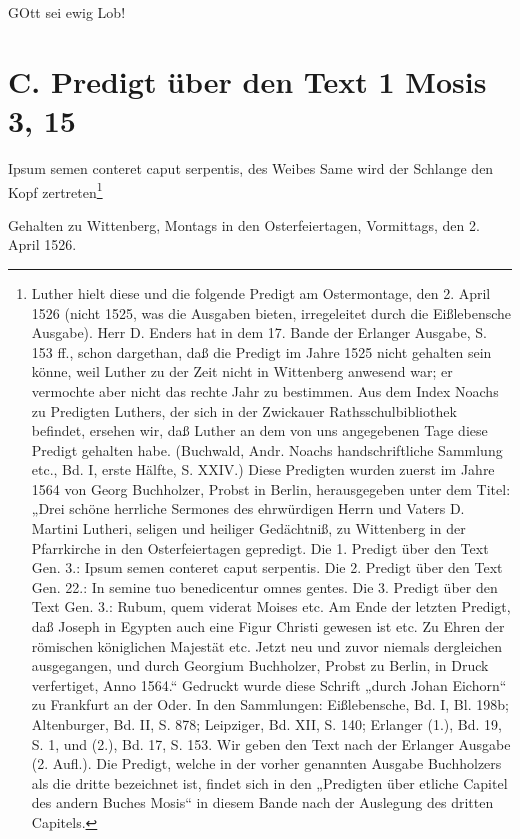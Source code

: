 GOtt sei ewig Lob!

\chapter{C. Predigt über den Text 1 Mosis 3, 15}

Ipsum semen conteret caput serpentis, des Weibes Same wird der Schlange den Kopf zertreten\footnote{Luther hielt diese und die folgende Predigt am Ostermontage, den 2. April 1526 (nicht 1525, was die Ausgaben bieten, irregeleitet durch die Eißlebensche Ausgabe). Herr D. Enders hat in dem 17. Bande der Erlanger Ausgabe, S. 153 ff., schon dargethan, daß die Predigt im Jahre 1525 nicht gehalten sein könne, weil Luther zu der Zeit nicht in Wittenberg anwesend war; er vermochte aber nicht das rechte Jahr zu bestimmen. Aus dem Index Noachs zu Predigten Luthers, der sich in der Zwickauer Rathsschulbibliothek befindet, ersehen wir, daß Luther an dem von uns angegebenen Tage diese Predigt gehalten habe. (Buchwald, Andr. Noachs handschriftliche Sammlung etc., Bd. I, erste Hälfte, S. XXIV.) Diese Predigten wurden zuerst im Jahre 1564 von Georg Buchholzer, Probst in Berlin, herausgegeben unter dem Titel: „Drei schöne herrliche Sermones des ehrwürdigen Herrn und Vaters D. Martini Lutheri, seligen und heiliger Gedächtniß, zu Wittenberg in der Pfarrkirche in den Osterfeiertagen gepredigt. Die 1. Predigt über den Text Gen. 3.: Ipsum semen conteret caput serpentis. Die 2. Predigt über den Text Gen. 22.: In semine tuo benedicentur omnes gentes. Die 3. Predigt über den Text Gen. 3.: Rubum, quem viderat Moises etc. Am Ende der letzten Predigt, daß Joseph in Egypten auch eine Figur Christi gewesen ist etc. Zu Ehren der römischen königlichen Majestät etc. Jetzt neu und zuvor niemals dergleichen ausgegangen, und durch Georgium Buchholzer, Probst zu Berlin, in Druck verfertiget, Anno 1564.“ Gedruckt wurde diese Schrift „durch Johan Eichorn“ zu Frankfurt an der Oder. In den Sammlungen: Eißlebensche, Bd. I, Bl. 198b; Altenburger, Bd. II, S. 878; Leipziger, Bd. XII, S. 140; Erlanger (1.), Bd. 19, S. 1, und (2.), Bd. 17, S. 153. Wir geben den Text nach der Erlanger Ausgabe (2. Aufl.). Die Predigt, welche in der vorher genannten Ausgabe Buchholzers als die dritte bezeichnet ist, findet sich in den „Predigten über etliche Capitel des andern Buches Mosis“ in diesem Bande nach der Auslegung des dritten Capitels.}

Gehalten zu Wittenberg, Montags in den Osterfeiertagen, Vormittags, den 2. April 1526.

